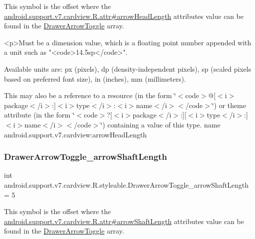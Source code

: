 This symbol is the offset where the \hyperlink{classandroid_1_1support_1_1v7_1_1cardview_1_1R_1_1attr_af325e0a81cb3c1eee00b490c7ae7b45d}{android.\+support.\+v7.\+cardview.\+R.\+attr\#arrow\+Head\+Length} attribute\textquotesingle{}s value can be found in the \hyperlink{classandroid_1_1support_1_1v7_1_1cardview_1_1R_1_1styleable_a159ca17c520d2f2d93f6152d01b0b8df}{Drawer\+Arrow\+Toggle} array.

\begin{DoxyVerb}      <p>Must be a dimension value, which is a floating point number appended with a unit such as "<code>14.5sp</code>".
\end{DoxyVerb}
 Available units are\+: px (pixels), dp (density-\/independent pixels), sp (scaled pixels based on preferred font size), in (inches), mm (millimeters). 

This may also be a reference to a resource (in the form \char`\"{}$<$code$>$@\mbox{[}$<$i$>$package$<$/i$>$\+:\mbox{]}$<$i$>$type$<$/i$>$\+:$<$i$>$name$<$/i$>$$<$/code$>$\char`\"{}) or theme attribute (in the form \char`\"{}$<$code$>$?\mbox{[}$<$i$>$package$<$/i$>$\+:\mbox{]}\mbox{[}$<$i$>$type$<$/i$>$\+:\mbox{]}$<$i$>$name$<$/i$>$$<$/code$>$\char`\"{}) containing a value of this type.  name android.\+support.\+v7.\+cardview\+:arrow\+Head\+Length \mbox{\label{classandroid_1_1support_1_1v7_1_1cardview_1_1R_1_1styleable_aba47177953e487458623d40854700ad5}} 
\subsubsection{\texorpdfstring{Drawer\+Arrow\+Toggle\+\_\+arrow\+Shaft\+Length}{DrawerArrowToggle\_arrowShaftLength}}
{\footnotesize\ttfamily int android.\+support.\+v7.\+cardview.\+R.\+styleable.\+Drawer\+Arrow\+Toggle\+\_\+arrow\+Shaft\+Length = 5\hspace{0.3cm}{\ttfamily [static]}}

This symbol is the offset where the \hyperlink{classandroid_1_1support_1_1v7_1_1cardview_1_1R_1_1attr_a3926af148e58c48e553b14e8f44e2b7f}{android.\+support.\+v7.\+cardview.\+R.\+attr\#arrow\+Shaft\+Length} attribute\textquotesingle{}s value can be found in the \hyperlink{classandroid_1_1support_1_1v7_1_1cardview_1_1R_1_1styleable_a159ca17c520d2f2d93f6152d01b0b8df}{Drawer\+Arrow\+Toggle} array.


